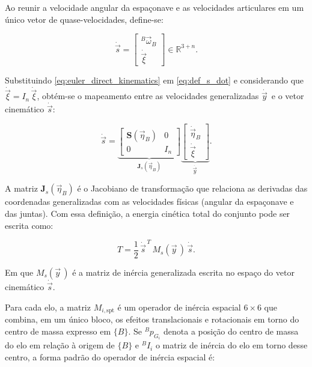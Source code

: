 Ao reunir a velocidade angular da espaçonave e as velocidades articulares em um único vetor de quase-velocidades, define-se:

\begin{equation}
\dot{\vec s}
=
\begin{bmatrix}
{}^{B}\!\vec\omega_B \\[2pt]
\dot{\vec\xi}
\end{bmatrix}
\in \mathbb{R}^{3+n}.
\label{eq:def_s_dot}
\end{equation}

Substituindo \eqref{eq:euler_direct_kinematics} em \eqref{eq:def_s_dot} e considerando que $\dot{\vec\xi}=I_n\,\dot{\vec\xi}$, obtém-se o mapeamento entre as velocidades generalizadas $\dot{\vec y\,}$ e o vetor cinemático $\dot{\vec s}$:

\begin{equation}
\dot{\vec s}
=
\underbrace{
\begin{bmatrix}
\mathbf{S}(\vec\eta_B) & 0 \\[2pt]
0 & I_{n}
\end{bmatrix}}_{\displaystyle \mathbf{J}_s(\vec\eta_B)}
\underbrace{
\begin{bmatrix}
\dot{\vec\eta}_B \\[2pt]
\dot{\vec\xi}
\end{bmatrix}}_{\displaystyle \dot{\vec y\,}}.
\label{eq:Js_mapping}
\end{equation}

A matriz $\mathbf{J}_s(\vec\eta_B)$ é o Jacobiano de transformação que relaciona as derivadas das coordenadas generalizadas com as velocidades físicas (angular da espaçonave e das juntas).
Com essa definição, a energia cinética total do conjunto pode ser escrita como:

\begin{equation}
T =
\frac{1}{2}\,\dot{\vec s}^{\,T}\,M_s(\vec y\, )\,\dot{\vec s}.
\label{eq_T_matriz_s}
\end{equation}

Em que $M_s(\vec y\, )$ é a matriz de inércia generalizada escrita no espaço do vetor
cinemático $\dot{\vec s}$.

Para cada elo, a matriz $M_{i,\text{spt}}$ é um operador de inércia
espacial $6\times 6$ que combina, em um único bloco, os efeitos
translacionais e rotacionais em torno do centro de massa expresso em
$\{B\}$.
Se ${}^{B}\!p_{G_i}$ denota a posição do centro de massa do elo em relação à
origem de $\{B\}$ e ${}^{B}\!I_i$ o matriz de inércia do elo em torno desse
centro, a forma padrão do operador de inércia espacial é:

